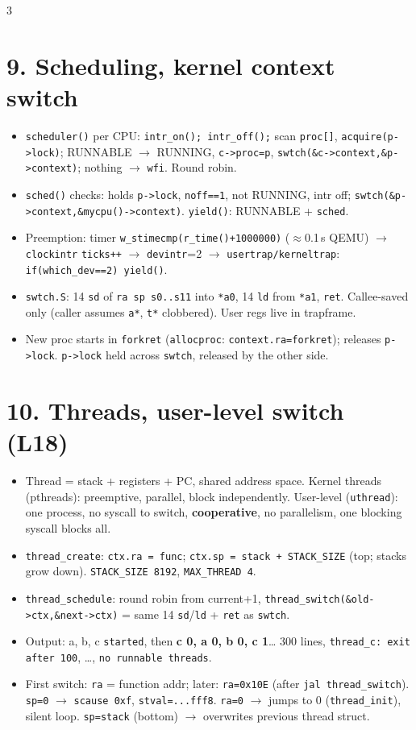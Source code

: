\documentclass[9pt]{extarticle}
\newcommand{\cc}[1]{\texttt{#1}}
\newcommand{\ra}{$\rightarrow$}
\begin{document}
\begin{multicols*}{3}
\section{9. Scheduling, kernel context switch}
\begin{itemize}
\item \cc{scheduler()} per CPU: \cc{intr\_on(); intr\_off();} scan \cc{proc[]}, \cc{acquire(p->lock)}; RUNNABLE \ra{} RUNNING, \cc{c->proc=p}, \cc{swtch(\&c->context,\&p->context)}; nothing \ra{} \cc{wfi}. Round robin.
\item \cc{sched()} checks: holds \cc{p->lock}, \cc{noff==1}, not RUNNING, intr off; \cc{swtch(\&p->context,\&mycpu()->context)}. \cc{yield()}: RUNNABLE + \cc{sched}.
\item Preemption: timer \cc{w\_stimecmp(r\_time()+1000000)} ($\approx$0.1\,s QEMU) \ra{} \cc{clockintr} \cc{ticks++} \ra{} \cc{devintr}=2 \ra{} \cc{usertrap/kerneltrap}: \cc{if(which\_dev==2) yield()}.
\item \cc{swtch.S}: 14 \cc{sd} of \cc{ra sp s0..s11} into \cc{*a0}, 14 \cc{ld} from \cc{*a1}, \cc{ret}. Callee-saved only (caller assumes \cc{a*}, \cc{t*} clobbered). User regs live in trapframe.
\item New proc starts in \cc{forkret} (\cc{allocproc}: \cc{context.ra=forkret}); releases \cc{p->lock}. \cc{p->lock} held across \cc{swtch}, released by the other side.
\end{itemize}

\section{10. Threads, user-level switch (L18)}
\begin{itemize}
\item Thread = stack + registers + PC, shared address space. Kernel threads (pthreads): preemptive, parallel, block independently. User-level (\cc{uthread}): one process, no syscall to switch, \textbf{cooperative}, no parallelism, one blocking syscall blocks all.
\item \cc{thread\_create}: \cc{ctx.ra = func}; \cc{ctx.sp = stack + STACK\_SIZE} (top; stacks grow down). \cc{STACK\_SIZE 8192}, \cc{MAX\_THREAD 4}.
\item \cc{thread\_schedule}: round robin from current+1, \cc{thread\_switch(\&old->ctx,\&next->ctx)} = same 14 \cc{sd}/\cc{ld} + \cc{ret} as \cc{swtch}.
\item Output: a, b, c \cc{started}, then \textbf{c 0, a 0, b 0, c 1}\ldots{} 300 lines, \cc{thread\_c: exit after 100}, \ldots, \cc{no runnable threads}.
\item First switch: \cc{ra} = function addr; later: \cc{ra=0x10E} (after \cc{jal thread\_switch}). \cc{sp=0} \ra{} \cc{scause 0xf}, \cc{stval=...fff8}. \cc{ra=0} \ra{} jumps to 0 (\cc{thread\_init}), silent loop. \cc{sp=stack} (bottom) \ra{} overwrites previous thread struct.
\end{itemize}



\end{multicols*}
\end{document}
